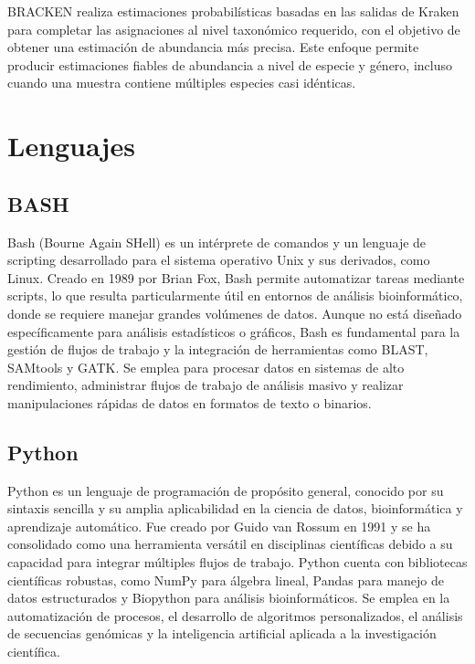 BRACKEN realiza estimaciones probabilísticas basadas en las salidas de Kraken para completar las asignaciones al nivel taxonómico requerido, con el objetivo de obtener una estimación de abundancia más precisa. Este enfoque permite producir estimaciones fiables de abundancia a nivel de especie y género, incluso cuando una muestra contiene múltiples especies casi idénticas.\\

\section{Lenguajes}

\subsection{BASH}
Bash (Bourne Again SHell) es un intérprete de comandos y un lenguaje de scripting desarrollado para el sistema operativo Unix y sus derivados, como Linux. Creado en 1989 por Brian Fox, Bash permite automatizar tareas mediante scripts, lo que resulta particularmente útil en entornos de análisis bioinformático, donde se requiere manejar grandes volúmenes de datos. Aunque no está diseñado específicamente para análisis estadísticos o gráficos, Bash es fundamental para la gestión de flujos de trabajo y la integración de herramientas como BLAST, SAMtools y GATK. Se emplea para procesar datos en sistemas de alto rendimiento, administrar flujos de trabajo de análisis masivo y realizar manipulaciones rápidas de datos en formatos de texto o binarios. \\

\subsection{Python}
Python es un lenguaje de programación de propósito general, conocido por su sintaxis sencilla y su amplia aplicabilidad en la ciencia de datos, bioinformática y aprendizaje automático. Fue creado por Guido van Rossum en 1991 y se ha consolidado como una herramienta versátil en disciplinas científicas debido a su capacidad para integrar múltiples flujos de trabajo. Python cuenta con bibliotecas científicas robustas, como NumPy para álgebra lineal, Pandas para manejo de datos estructurados y Biopython para análisis bioinformáticos. Se emplea en la automatización de procesos, el desarrollo de algoritmos personalizados, el análisis de secuencias genómicas y la inteligencia artificial aplicada a la investigación científica.\\

